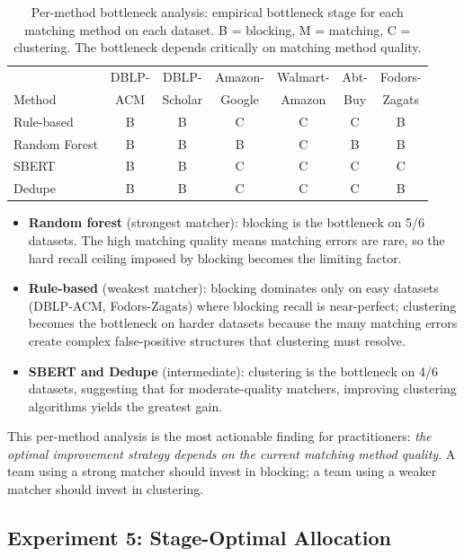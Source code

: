 \documentclass{article}
\begin{document}
\begin{table}[t]
\caption{Per-method bottleneck analysis: empirical bottleneck stage for each matching method on each dataset. B = blocking, M = matching, C = clustering. The bottleneck depends critically on matching method quality.}
\label{tab:method_bottleneck}
\centering
\small
\begin{tabular}{lcccccc}
\toprule
 & DBLP- & DBLP- & Amazon- & Walmart- & Abt- & Fodors- \\
Method & ACM & Scholar & Google & Amazon & Buy & Zagats \\
\midrule
Rule-based & B & B & C & C & C & B \\
Random Forest & B & B & B & C & B & B \\
SBERT & B & B & C & C & C & C \\
Dedupe & B & B & C & C & C & B \\
\bottomrule
\end{tabular}
\end{table}

\begin{itemize}
    \item \textbf{Random forest} (strongest matcher): blocking is the bottleneck on 5/6 datasets. The high matching quality means matching errors are rare, so the hard recall ceiling imposed by blocking becomes the limiting factor.
    \item \textbf{Rule-based} (weakest matcher): blocking dominates only on easy datasets (DBLP-ACM, Fodors-Zagats) where blocking recall is near-perfect; clustering becomes the bottleneck on harder datasets because the many matching errors create complex false-positive structures that clustering must resolve.
    \item \textbf{SBERT and Dedupe} (intermediate): clustering is the bottleneck on 4/6 datasets, suggesting that for moderate-quality matchers, improving clustering algorithms yields the greatest gain.
\end{itemize}

This per-method analysis is the most actionable finding for practitioners: \emph{the optimal improvement strategy depends on the current matching method quality}. A team using a strong matcher should invest in blocking; a team using a weaker matcher should invest in clustering.

\subsection{Experiment 5: Stage-Optimal Allocation}
\end{document}
